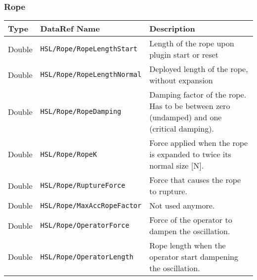 \documentclass[10pt,a4]{scrartcl}
\begin{document}
\subsubsection{Rope}
\begin{tabularx}{\linewidth}{| l | l | X |} \hline
\textbf{Type} & \textbf{DataRef Name}& \textbf{Description}\\ \hline
Double & \texttt{HSL/Rope/RopeLengthStart} & Length of the rope upon plugin start or reset\\ \hline
Double & \texttt{HSL/Rope/RopeLengthNormal} & Deployed length of the rope, without expansion\\ \hline
Double & \texttt{HSL/Rope/RopeDamping} & Damping factor of the rope. Has to be between zero (undamped) and one (critical damping).\\ \hline
Double & \texttt{HSL/Rope/RopeK} & Force applied when the rope is expanded to twice its normal size [N].\\ \hline
Double & \texttt{HSL/Rope/RuptureForce} & Force that causes the rope to rupture.\\ \hline
Double & \texttt{HSL/Rope/MaxAccRopeFactor} & Not used anymore.\\ \hline
Double & \texttt{HSL/Rope/OperatorForce} & Force of the operator to dampen the oscillation.\\ \hline
Double & \texttt{HSL/Rope/OperatorLength} & Rope length when the operator start dampening the oscillation.\\ \hline
\end{tabularx}
\end{document}
